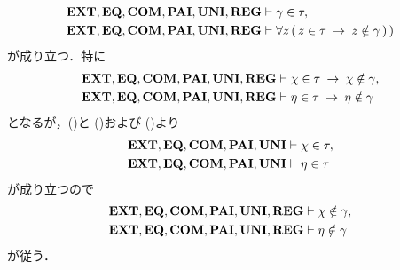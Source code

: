 \begin{sketch}
\begin{align}
			\EXTAX,\EQAX,\COMAX,\PAIAX,\UNIAX,\REGAX &\vdash \gamma \in \tau, 
			\label{fom:no_three_sets_go_round_13} \\
			\EXTAX,\EQAX,\COMAX,\PAIAX,\UNIAX,\REGAX &\vdash \forall z\, (\, z \in \tau \rarrow z \notin \gamma\, )\, )
			\label{fom:no_three_sets_go_round_14}
		\end{align}
		が成り立つ．特に
		\begin{align}
			\mbox{{\bf EXT}},\mbox{{\bf EQ}},\mbox{\bf COM},\mbox{{\bf PAI}},\mbox{{\bf UNI}},\mbox{{\bf REG}} &\vdash \chi \in \tau \hspace{0.25em}\rightarrow\hspace{0.25em} \chi \notin \gamma, \\
			\mbox{{\bf EXT}},\mbox{{\bf EQ}},\mbox{\bf COM},\mbox{{\bf PAI}},\mbox{{\bf UNI}},\mbox{{\bf REG}} &\vdash \eta \in \tau \hspace{0.25em}\rightarrow\hspace{0.25em} \eta \notin \gamma
		\end{align}
		となるが，()と
		()および
		()より
		\begin{align}
			\mbox{{\bf EXT}},\mbox{{\bf EQ}},\mbox{\bf COM},\mbox{{\bf PAI}},\mbox{{\bf UNI}} &\vdash \chi \in \tau, \\
			\mbox{{\bf EXT}},\mbox{{\bf EQ}},\mbox{\bf COM},\mbox{{\bf PAI}},\mbox{{\bf UNI}} &\vdash \eta \in \tau
		\end{align}
		が成り立つので
		\begin{align}
			\EXTAX,\EQAX,\COMAX,\PAIAX,\UNIAX,\REGAX &\vdash \chi \notin \gamma, 
			\label{fom:no_three_sets_go_round_15} \\
			\EXTAX,\EQAX,\COMAX,\PAIAX,\UNIAX,\REGAX &\vdash \eta \notin \gamma
			\label{fom:no_three_sets_go_round_16}
		\end{align}
		が従う．
	\end{sketch}